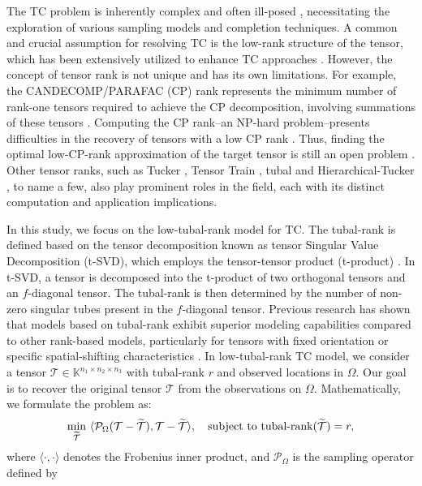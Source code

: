 \documentclass[twoside,12pt]{article}
\def\tX{\mathcal{T}}
\def\tX{\mathcal{T}}
\begin{document}
The TC problem is inherently complex and often ill-posed \citep{grasedyck2019stable,zhaoxile2022}, necessitating the exploration of various sampling models and completion techniques. A common and crucial assumption for resolving TC is the low-rank structure of the tensor, which has been extensively utilized to enhance TC approaches \citep{argyriou2008convex, Liu2013Tensor, zhang2017exact}. However, the concept of tensor rank is not unique and has its own limitations. For example, the CANDECOMP/PARAFAC (CP) rank represents the minimum number of rank-one tensors required to achieve the CP decomposition, involving summations of these tensors \citep{HF1927}. Computing the CP rank--an NP-hard problem--presents difficulties in the recovery of tensors with a low CP rank \citep{johan1990tensor}. Thus, finding
the optimal low-CP-rank approximation of the target tensor is still an open problem \citep{zhaoxile2022}. Other tensor ranks, such as Tucker \citep{tucker1966},  Tensor Train \citep{oseledets2011tensor}, tubal \citep{KBHH2013} and Hierarchical-Tucker \citep{grasedyck2010hierarchical,hackbusch2009new}, 
to name a few, also play prominent roles in the field, each with its distinct computation and application implications.

In this study, we focus on the low-tubal-rank model for TC. The tubal-rank is defined based on the tensor decomposition known as tensor Singular Value Decomposition (t-SVD), which employs the tensor-tensor product (t-product)  \citep{kilmer2011factorization}. In t-SVD, a tensor is decomposed into the t-product of two orthogonal tensors and an $f$-diagonal tensor. The tubal-rank is then determined by the number of non-zero singular tubes present in the $f$-diagonal tensor. Previous research has shown that models based on  tubal-rank exhibit  superior modeling capabilities compared to other rank-based models, particularly for tensors with fixed orientation or specific spatial-shifting characteristics \citep{qin2022loww,zhang2020low}. In  low-tubal-rank TC model, we consider a tensor  $\tX\in\mathbb{K}^{n_1\times n_2\times n_3}$ with tubal-rank $r$ and  observed locations in $\Omega$. Our goal is to recover the original tensor $\tX$ from the observations on $\Omega$. Mathematically, we formulate the   problem as: 
\vspace{-2mm}
\begin{equation}  \label{eq:TC model}
    \min_{\widetilde{\tX}}~
\langle\mathcal{P}_{\Omega}(\tX-\widetilde{\tX}), \tX-\widetilde{\tX}\rangle,~~~
\text{subject to}~ \text{tubal-rank}(\widetilde{\tX})= r,
\vspace{-1mm}
\end{equation}   
where $\langle \cdot,\cdot\rangle$ denotes the Frobenius inner product, and $\mathcal{P}_{\Omega}$ is the sampling operator defined by 
\end{document}
